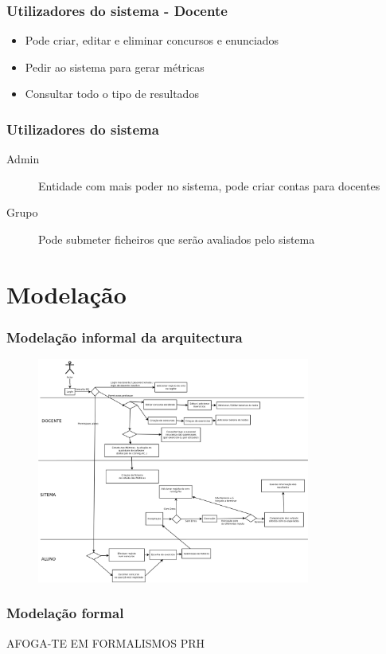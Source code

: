 \documentclass{beamer}
\begin{document}
\begin{frame} \frametitle{Utilizadores do sistema - Docente}
\begin{itemize}
\item Pode criar, editar e eliminar concursos e enunciados
\item Pedir ao sistema para gerar métricas
\item Consultar todo o tipo de resultados
\end{itemize}
\end{frame}

\begin{frame} \frametitle{Utilizadores do sistema}
\begin{description}
\item[Admin] Entidade com mais poder no sistema, pode criar contas para docentes
\item[Grupo] Pode submeter ficheiros que serão avaliados pelo sistema
\end{description}
\end{frame}

\section{Modelação}
\begin{frame} \frametitle{Modelação informal da arquitectura}
\begin{figure}[htbp]
\begin{center}
\includegraphics[width=0.8\textwidth]{../report1/Images/EL-PI}
\end{center}
\end{figure}
\end{frame}

\begin{frame} \frametitle{Modelação formal}
AFOGA-TE EM FORMALISMOS PRH
\end{frame}
\end{document}
